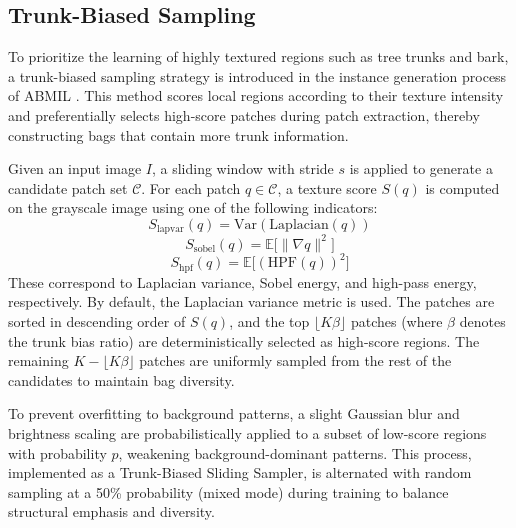 \subsection{Trunk-Biased Sampling}
To prioritize the learning of highly textured regions such as tree trunks and bark, a trunk-biased sampling strategy is introduced in the instance generation process of ABMIL \cite{ref2}. This method scores local regions according to their texture intensity and preferentially selects high-score patches during patch extraction, thereby constructing bags that contain more trunk information.

Given an input image $I$, a sliding window with stride $s$ is applied to generate a candidate patch set $\mathcal{C}$. For each patch $q\in\mathcal{C}$, a texture score $S(q)$ is computed on the grayscale image using one of the following indicators:
\begin{equation}\tag{7}
S_{\mathrm{lapvar}}(q)=\mathrm{Var}(\mathrm{Laplacian}(q))
\end{equation}
\begin{equation}\tag{8}
S_{\mathrm{sobel}}(q)=\mathbb{E}\bigl[\lVert \nabla q\rVert^2\bigr]
\end{equation}
\begin{equation}\tag{9}
S_{\mathrm{hpf}}(q)=\mathbb{E}\bigl[(\mathrm{HPF}(q))^2\bigr]
\end{equation}
These correspond to Laplacian variance, Sobel energy, and high-pass energy, respectively. By default, the Laplacian variance metric is used. The patches are sorted in descending order of $S(q)$, and the top $\lfloor K\beta\rfloor$ patches (where $\beta$ denotes the trunk bias ratio) are deterministically selected as high-score regions. The remaining $K-\lfloor K\beta\rfloor$ patches are uniformly sampled from the rest of the candidates to maintain bag diversity.

To prevent overfitting to background patterns, a slight Gaussian blur and brightness scaling are probabilistically applied to a subset of low-score regions with probability $p$, weakening background-dominant patterns. This process, implemented as a Trunk-Biased Sliding Sampler, is alternated with random sampling at a 50\% probability (mixed mode) during training to balance structural emphasis and diversity.

